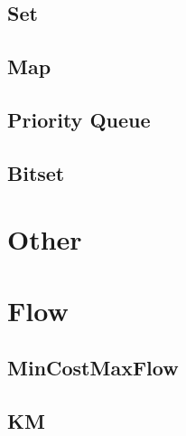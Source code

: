 \subsection{Set}


\subsection{Map}


\subsection{Priority Queue}


\subsection{Bitset}


\section{Other}


\section{Flow}

\subsection{MinCostMaxFlow}




\subsection{KM}


